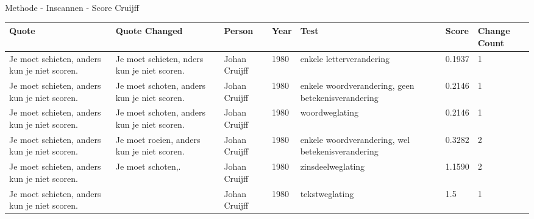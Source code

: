 \documentclass[12pt]{article}
\begin{document}
\Large Methode - Inscannen - Score
\noindent\large Cruijff
\small
\begin{longtable}{|p{}|p{}|p{}|p{}|p{}|p{}|p{}|}
\hline
\textbf{Quote} & \textbf{Quote Changed} & \textbf{Person} & \textbf{Year} & \textbf{Test} & \textbf{Score} & \textbf{Change Count} \\
\hline
\endhead
%
\endfoot
%
Je moet schieten, anders kun je niet scoren. & Je moet schieten, nders kun je niet scoren. & Johan Cruijff & 1980 & enkele letterverandering & 0.1937 & 1 \\
\hline
Je moet schieten, anders kun je niet scoren. & Je moet schoten, anders kun je niet scoren. & Johan Cruijff & 1980 & enkele woordverandering, geen betekenisverandering & 0.2146 & 1 \\
\hline
Je moet schieten, anders kun je niet scoren. & Je moet schoten, anders kun je niet scoren. & Johan Cruijff & 1980 & woordweglating & 0.2146 & 1 \\
\hline
Je moet schieten, anders kun je niet scoren. & Je moet roeien, anders kun je niet scoren. & Johan Cruijff & 1980 & enkele woordverandering, wel betekenisverandering & 0.3282 & 2 \\
\hline
Je moet schieten, anders kun je niet scoren. & Je moet schoten,. & Johan Cruijff & 1980 & zinsdeelweglating & 1.1590 & 2 \\
\hline
Je moet schieten, anders kun je niet scoren. &  & Johan Cruijff & 1980 & tekstweglating & 1.5 & 1 \\
\hline
\end{longtable}
\end{document}
